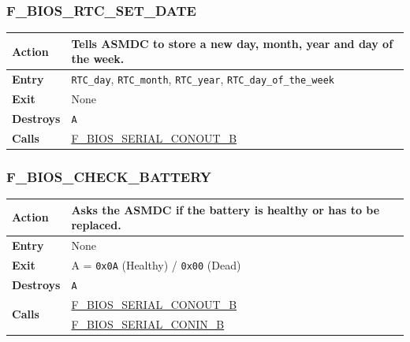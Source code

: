 \documentclass[a4paper,11pt]{article}
\begin{document}
        \subsubsection{F\_BIOS\_RTC\_SET\_DATE}
        \label{func:fbiosrtcsetdate}
        \begin{tabular}{l p{9cm}}
            \hline\textbf{Action}
            & Tells \textbf{ASMDC} to store a new day, month, year and day of
            the week. \\
            \hline\textbf{Entry} & \texttt{RTC\_day}, \texttt{RTC\_month},
            \texttt{RTC\_year}, \texttt{RTC\_day\_of\_the\_week} \\
            \hline\textbf{Exit} & None\\
            \hline\textbf{Destroys} & \texttt{A} \\
            \hline\textbf{Calls}
            & \hyperref[func:fbiosserialconoutb]{F\_BIOS\_SERIAL\_CONOUT\_B}\\
            \hline
        \end{tabular}

         \subsubsection{F\_BIOS\_CHECK\_BATTERY}
         \label{func:fbiosrtccheckbattery}
         \begin{tabular}{l p{9cm}}
             \hline\textbf{Action}
             & Asks the \textbf{ASMDC} if the battery is healthy or has to be
             replaced. \\
             \hline\textbf{Entry} & None\\
             \hline\textbf{Exit} & A = \texttt{0x0A} (Healthy) / \texttt{0x00}
             (Dead)\\
             \hline\textbf{Destroys} & \texttt{A} \\
             \hline\multirow[t]{2}{4em}{\textbf{Calls}}
            & \hyperref[func:fbiosserialconoutb]{F\_BIOS\_SERIAL\_CONOUT\_B}\\
            & \hyperref[func:fbiosserialconinb]{F\_BIOS\_SERIAL\_CONIN\_B}\\
             \hline
         \end{tabular}
\end{document}

